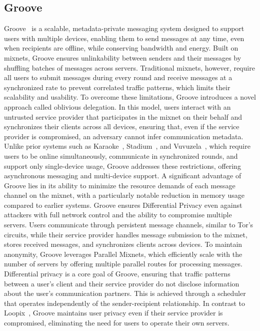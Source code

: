 \subsection{Groove}\label{subsec:groove}
Groove~\cite{Groove} is a scalable, metadata-private messaging system designed to support users with multiple devices, enabling them to send messages at any time, even when recipients are offline, while conserving bandwidth and energy. Built on mixnets, Groove ensures unlinkability between senders and their messages by shuffling batches of messages across servers. Traditional mixnets, however, require all users to submit messages during every round and receive messages at a synchronized rate to prevent correlated traffic patterns, which limits their scalability and usability.
To overcome these limitations, Groove introduces a novel approach called oblivious delegation. In this model, users interact with an untrusted service provider that participates in the mixnet on their behalf and synchronizes their clients across all devices, ensuring that, even if the service provider is compromised, an adversary cannot infer communication metadata. Unlike prior systems such as Karaoke~\cite{Karaoke}, Stadium~\cite{Stadium}, and Vuvuzela~\cite{Vuvuzela}, which require users to be online simultaneously, communicate in synchronized rounds, and support only single-device usage, Groove addresses these restrictions, offering asynchronous messaging and multi-device support.
A significant advantage of Groove lies in its ability to minimize the resource demands of each message channel on the mixnet, with a particularly notable reduction in memory usage compared to earlier systems. Groove ensures Differential Privacy even against attackers with full network control and the ability to compromise multiple servers. Users communicate through persistent message channels, similar to Tor's circuits, while their service provider handles message submission to the mixnet, stores received messages, and synchronizes clients across devices. To maintain anonymity, Groove leverages Parallel Mixnets, which efficiently scale with the number of servers by offering multiple parallel routes for processing messages.
Differential privacy is a core goal of Groove, ensuring that traffic patterns between a user's client and their service provider do not disclose information about the user's communication partners. This is achieved through a scheduler that operates independently of the sender-recipient relationship. In contrast to Loopix~\cite{Loopix}, Groove maintains user privacy even if their service provider is compromised, eliminating the need for users to operate their own servers.

